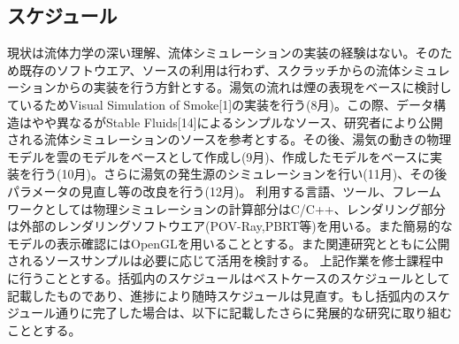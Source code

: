\subsection{スケジュール}
現状は流体力学の深い理解、流体シミュレーションの実装の経験はない。そのため既存のソフトウエア、ソースの利用は行わず、スクラッチからの流体シミュレーションからの実装を行う方針とする。湯気の流れは煙の表現をベースに検討しているためVisual Simulation of Smoke[1]の実装を行う(8月)。この際、データ構造はやや異なるがStable Fluids[14]によるシンプルなソース、研究者により公開される流体シミュレーションのソースを参考とする。その後、湯気の動きの物理モデルを雲のモデルをベースとして作成し(9月)、作成したモデルをベースに実装を行う(10月)。さらに湯気の発生源のシミュレーションを行い(11月)、その後パラメータの見直し等の改良を行う(12月)。
利用する言語、ツール、フレームワークとしては物理シミュレーションの計算部分はC/C++、レンダリング部分は外部のレンダリングソフトウエア(POV-Ray,PBRT等)を用いる。また簡易的なモデルの表示確認にはOpenGLを用いることとする。また関連研究とともに公開されるソースサンプルは必要に応じて活用を検討する。
上記作業を修士課程中に行うこととする。括弧内のスケジュールはベストケースのスケジュールとして記載したものであり、進捗により随時スケジュールは見直す。もし括弧内のスケジュール通りに完了した場合は、以下に記載したさらに発展的な研究に取り組むこととする。

